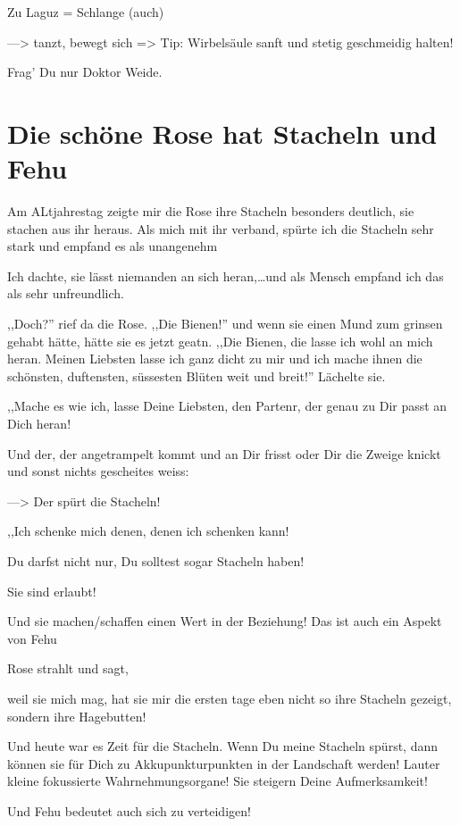 \documentclass[11pt,titlepage,a5paper]{book}
\begin{document}
Zu Laguz  = Schlange (auch)

---> tanzt, bewegt sich => Tip: Wirbelsäule sanft und stetig geschmeidig halten!

Frag' Du nur Doktor Weide. 

\section{Die schöne Rose hat Stacheln und Fehu  }

Am ALtjahrestag zeigte mir die Rose ihre Stacheln besonders deutlich, sie stachen aus ihr heraus. Als mich mit ihr verband, spürte ich die Stacheln sehr stark und empfand es als unangenehm

Ich dachte, sie lässt niemanden an sich heran,\dots und als Mensch empfand ich das als sehr unfreundlich.

,,Doch?'' rief da die Rose. ,,Die Bienen!'' und wenn sie einen Mund zum grinsen gehabt hätte, hätte sie es jetzt geatn. ,,Die Bienen, die lasse ich wohl an mich heran. Meinen Liebsten lasse ich ganz dicht zu mir und ich mache ihnen die schönsten, duftensten, süssesten Blüten weit und breit!'' Lächelte sie.

,,Mache es wie ich, lasse Deine Liebsten, den Partenr, der genau zu Dir passt an Dich heran! 

Und der, der angetrampelt kommt und an Dir frisst oder Dir die Zweige knickt und sonst nichts gescheites weiss:

---> Der spürt die Stacheln!

,,Ich schenke mich denen, denen ich schenken kann! 
 
Du darfst nicht nur, Du solltest sogar Stacheln haben!

Sie sind erlaubt!

Und sie machen/schaffen einen Wert in der Beziehung! Das ist auch ein Aspekt von Fehu 

Rose strahlt und sagt,

weil sie mich mag, hat sie mir die ersten tage eben nicht so ihre Stacheln gezeigt, sondern ihre Hagebutten!

Und heute war es Zeit für die Stacheln. Wenn Du meine Stacheln spürst, dann können sie für Dich zu Akkupunkturpunkten in der Landschaft werden! Lauter kleine fokussierte Wahrnehmungsorgane! Sie steigern Deine Aufmerksamkeit!

Und Fehu  bedeutet auch sich zu verteidigen!
\end{document}
